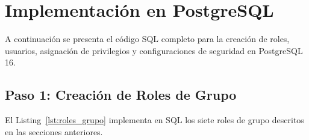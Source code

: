 \documentclass[conference, onecolumn]{IEEEtran}
\begin{document}
\section{Implementación en PostgreSQL}

A continuación se presenta el código SQL completo para la creación de roles, usuarios, asignación de privilegios y configuraciones de seguridad en PostgreSQL 16.

\subsection{Paso 1: Creación de Roles de Grupo}

El Listing~\ref{lst:roles_grupo} implementa en SQL los siete roles de grupo descritos en las secciones anteriores.
\end{document}
